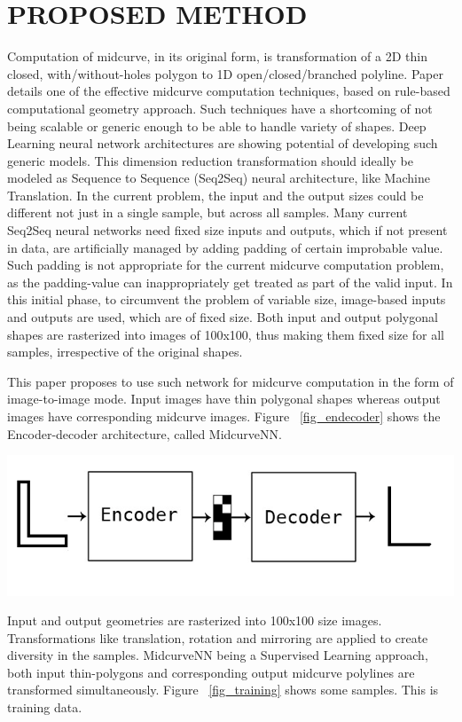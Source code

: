 \documentclass[9pt,academicons]{article}
\begin{document}
\section{PROPOSED METHOD}
\label{sec:proposedmethod}
Computation of midcurve, in its original form, is transformation of a 2D thin closed, with/without-holes polygon to 1D open/closed/branched polyline. Paper \cite{dimred2017} details one of the effective midcurve computation techniques, based on rule-based computational geometry approach. Such techniques have a shortcoming of not being scalable or generic enough to be able to handle variety of shapes. Deep Learning neural network architectures are showing potential of developing such generic models. This dimension reduction transformation should ideally be modeled as Sequence to Sequence (Seq2Seq) neural architecture, like Machine Translation. In the current problem, the input and the output sizes could be different not just in a single sample, but across all samples. Many current Seq2Seq neural networks need fixed size inputs and outputs, which if not present in data, are artificially managed by adding padding of certain improbable value. Such padding is not appropriate for the current midcurve computation problem, as the padding-value can inappropriately get treated as part of the valid input. In this initial phase, to circumvent the problem of variable size, image-based inputs and outputs are used, which are of fixed size. Both input and output polygonal shapes are rasterized into images of 100x100, thus making them fixed size for all samples, irrespective of the original shapes.

This paper proposes to use such network for midcurve computation in the form of image-to-image mode. Input images have thin polygonal shapes whereas output images have corresponding midcurve images. Figure ~\ref{fig_endecoder} shows the Encoder-decoder architecture, called MidcurveNN.

     \begin{center}
	\includegraphics[width=0.6\linewidth]{images/midcurve_encoder_decoder}
	\label{fig_endecoder}
    \end{center}
    
Input and output geometries are rasterized into 100x100 size images. Transformations like translation, rotation and mirroring are applied to create diversity in the samples. MidcurveNN being a Supervised Learning approach, both input thin-polygons and corresponding output midcurve polylines are transformed simultaneously. Figure ~\ref{fig_training} shows some samples. This is training data.    
\end{document}
